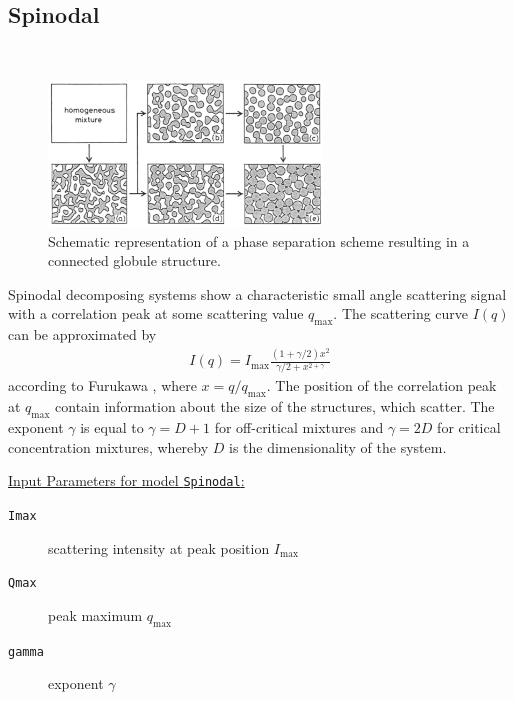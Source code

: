 \subsection{Spinodal}
\label{sect:Spinodal}
~\\

\begin{figure}[htb]
\begin{center}
\includegraphics[width=0.648\textwidth]{spinodal2.png}
\end{center}
\caption{Schematic representation of a phase separation scheme
resulting in a connected globule structure.} \label{Spinodal}
\end{figure}

Spinodal decomposing systems show a characteristic small angle
scattering signal with a correlation peak at some scattering value
$q_\text{max}$. The scattering curve $I(q)$ can be approximated by
\begin{align}
I(q) = I_\text{max} \frac{(1+\gamma/2)x^2}{\gamma/2+x^{2+\gamma}}
\end{align}
according to Furukawa \cite{Furukawa1984}, where $x=q/q_\text{max}$.
The position of the correlation peak at $q_\text{max}$ contain
information about the size of the structures, which scatter. The
exponent $\gamma$ is equal to $\gamma=D+1$ for off-critical mixtures
and $\gamma=2D$ for critical concentration mixtures, whereby $D$ is
the dimensionality of the system.

\vspace{5mm}

\underline{Input Parameters for model \texttt{Spinodal}:}\\
\begin{description}
\item[\texttt{Imax}] scattering intensity at peak position $I_\text{max}$
\item[\texttt{Qmax}] peak maximum $q_\text{max}$
\item[\texttt{gamma}] exponent $\gamma$
\end{description}

